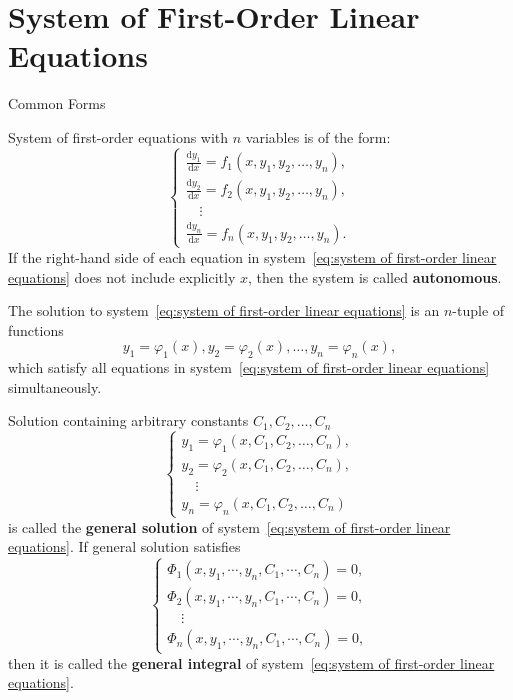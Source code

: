 \documentclass[11pt]{../../TexTemplate/elegantbook}
\begin{document}
\section{System of First-Order Linear Equations}
\begin{leftbarTitle}{Common Forms}\end{leftbarTitle}
System of first-order equations with \(n\) variables is of the form:
\begin{equation}\label{eq:system of first-order linear equations}
    \begin{cases}
        \frac{\mathrm{d}y_1}{\mathrm{d}x} = f_1(x, y_1, y_2, \ldots, y_n), \\
        \frac{\mathrm{d}y_2}{\mathrm{d}x} = f_2(x, y_1, y_2, \ldots, y_n), \\
        \quad\vdots \\
        \frac{\mathrm{d}y_n}{\mathrm{d}x} = f_n(x, y_1, y_2, \ldots, y_n).
    \end{cases}
\end{equation}
If the right-hand side of each equation in system~\eqref{eq:system of first-order linear equations}
does not include explicitly \(x\), then the system is called \textbf{autonomous}.

The solution to system~\eqref{eq:system of first-order linear equations} is an \(n\)-tuple of functions
\[y_1 = \varphi_1(x), y_2 = \varphi_2(x), \ldots, y_n = \varphi_n(x),\]
which satisfy all equations in system~\eqref{eq:system of first-order linear equations} simultaneously.

Solution containing arbitrary constants \(C_{1}, C_{2}, \ldots, C_{n}\)
\[
\begin{cases} 
    y_{1}=\varphi_{1}(x, C_{1}, C_{2}, \ldots, C_{n}),\\ 
    y_{2}=\varphi_{2}(x, C_{1}, C_{2}, \ldots, C_{n}), \\ 
    \quad\vdots \\ 
    y_{n}=\varphi_{n}(x, C_{1}, C_{2}, \ldots, C_{n}) 
\end{cases}
\]
is called the \textbf{general solution} of system~\eqref{eq:system of first-order linear equations}.
If general solution satisfies 
\[
\begin{cases} 
    \Phi_{1}(x, y_{1}, \cdots, y_{n}, C_{1}, \cdots, C_{n})=0, \\ 
    \Phi_{2}(x, y_{1}, \cdots, y_{n}, C_{1}, \cdots, C_{n})=0, \\ 
    \quad\vdots \\ 
    \Phi_{n}(x, y_{1}, \cdots, y_{n}, C_{1}, \cdots, C_{n})=0,
\end{cases}
\]
then it is called the \textbf{general integral} of system~\eqref{eq:system of first-order linear equations}.
\end{document}
